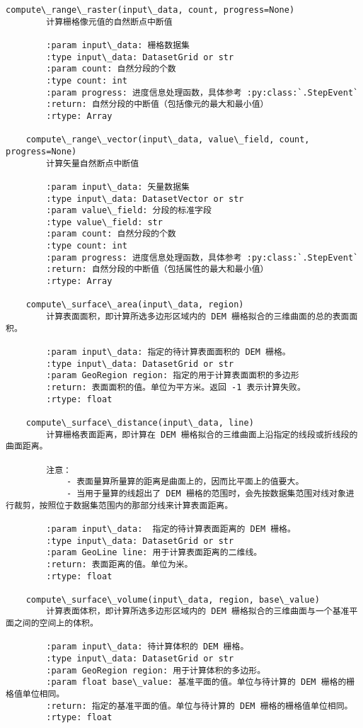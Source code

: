 \documentclass[11pt]{article}
\begin{document}
\begin{Verbatim}[commandchars=\\\{\}]
    compute\_range\_raster(input\_data, count, progress=None)
        计算栅格像元值的自然断点中断值
        
        :param input\_data: 栅格数据集
        :type input\_data: DatasetGrid or str
        :param count: 自然分段的个数
        :type count: int
        :param progress: 进度信息处理函数，具体参考 :py:class:`.StepEvent`
        :return: 自然分段的中断值（包括像元的最大和最小值）
        :rtype: Array
    
    compute\_range\_vector(input\_data, value\_field, count, progress=None)
        计算矢量自然断点中断值
        
        :param input\_data: 矢量数据集
        :type input\_data: DatasetVector or str
        :param value\_field: 分段的标准字段
        :type value\_field: str
        :param count: 自然分段的个数
        :type count: int
        :param progress: 进度信息处理函数，具体参考 :py:class:`.StepEvent`
        :return: 自然分段的中断值（包括属性的最大和最小值）
        :rtype: Array
    
    compute\_surface\_area(input\_data, region)
        计算表面面积，即计算所选多边形区域内的 DEM 栅格拟合的三维曲面的总的表面面积。
        
        :param input\_data: 指定的待计算表面面积的 DEM 栅格。
        :type input\_data: DatasetGrid or str
        :param GeoRegion region: 指定的用于计算表面面积的多边形
        :return: 表面面积的值。单位为平方米。返回 -1 表示计算失败。
        :rtype: float
    
    compute\_surface\_distance(input\_data, line)
        计算栅格表面距离，即计算在 DEM 栅格拟合的三维曲面上沿指定的线段或折线段的曲面距离。
        
        注意：
            - 表面量算所量算的距离是曲面上的，因而比平面上的值要大。
            - 当用于量算的线超出了 DEM 栅格的范围时，会先按数据集范围对线对象进行裁剪，按照位于数据集范围内的那部分线来计算表面距离。
        
        :param input\_data:  指定的待计算表面距离的 DEM 栅格。
        :type input\_data: DatasetGrid or str
        :param GeoLine line: 用于计算表面距离的二维线。
        :return: 表面距离的值。单位为米。
        :rtype: float
    
    compute\_surface\_volume(input\_data, region, base\_value)
        计算表面体积，即计算所选多边形区域内的 DEM 栅格拟合的三维曲面与一个基准平面之间的空间上的体积。
        
        :param input\_data: 待计算体积的 DEM 栅格。
        :type input\_data: DatasetGrid or str
        :param GeoRegion region: 用于计算体积的多边形。
        :param float base\_value: 基准平面的值。单位与待计算的 DEM 栅格的栅格值单位相同。
        :return: 指定的基准平面的值。单位与待计算的 DEM 栅格的栅格值单位相同。
        :rtype: float
    

\end{Verbatim}
\end{document}
